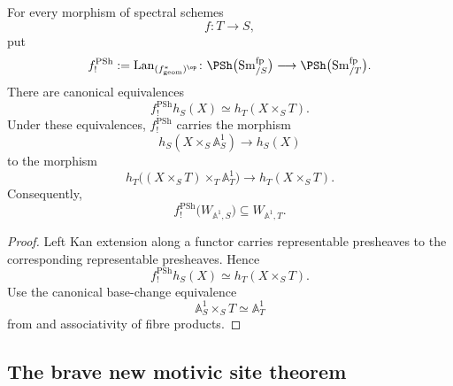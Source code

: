\begin{proposition}
\label{prop:affine-line-projection-base-change}
For every morphism of spectral schemes
\[
    f
    \colon
    T
    \longrightarrow
    S,
\]
put
\[
    f^{\mathrm{PSh}}_!
    :=
    \operatorname{Lan}_{(f^*_{\mathrm{geom}})^{\op}}
    \colon
    \PSh
    \bigl(
        \operatorname{Sm}^{\mathrm{fp}}_{/S}
    \bigr)
    \longrightarrow
    \PSh
    \bigl(
        \operatorname{Sm}^{\mathrm{fp}}_{/T}
    \bigr).
\]
There are canonical equivalences
\[
    f^{\mathrm{PSh}}_!h_S(X)
    \simeq
    h_T(X\times_ST).
\]
Under these equivalences, $f^{\mathrm{PSh}}_!$ carries the morphism
\[
    h_S(X\times_S\mathbb A^1_S)
    \longrightarrow
    h_S(X)
\]
to the morphism
\[
    h_T
    \bigl(
        (X\times_ST)\times_T\mathbb A^1_T
    \bigr)
    \longrightarrow
    h_T(X\times_ST).
\]
Consequently,
\[
    f^{\mathrm{PSh}}_!
    \bigl(
        W_{\mathbb A^1,S}
    \bigr)
    \subseteq
    W_{\mathbb A^1,T}.
\]
\end{proposition}

\begin{proof}
Left Kan extension along a functor carries representable presheaves to
the corresponding representable presheaves. Hence
\[
    f^{\mathrm{PSh}}_!h_S(X)
    \simeq
    h_T(X\times_ST).
\]
Use the canonical base-change equivalence
\[
    \mathbb A^1_S\times_ST
    \simeq
    \mathbb A^1_T
\]
from  and associativity of fibre
products.
\end{proof}

\subsection{The brave new motivic site theorem}

